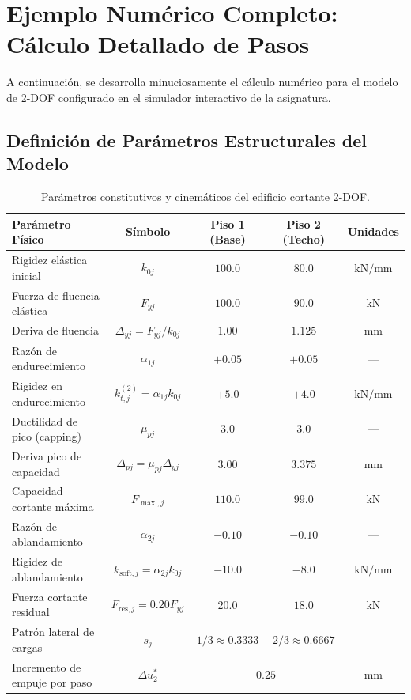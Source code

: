 \documentclass[11pt,letterpaper]{article}
\begin{document}
\section{Ejemplo Numérico Completo: Cálculo Detallado de Pasos}

A continuación, se desarrolla minuciosamente el cálculo numérico para el modelo de 2-DOF configurado en el simulador interactivo de la asignatura.

\subsection{Definición de Parámetros Estructurales del Modelo}

\begin{table}[htbp]
\centering
\caption{Parámetros constitutivos y cinemáticos del edificio cortante 2-DOF.}
\label{tab:parametros}
\begin{tabularx}{\textwidth}{lcccc}
\toprule
\textbf{Parámetro Físico} & \textbf{Símbolo} & \textbf{Piso 1 (Base)} & \textbf{Piso 2 (Techo)} & \textbf{Unidades} \\
\midrule
Rigidez elástica inicial & $k_{0j}$ & $100.0$ & $80.0$ & $\text{kN/mm}$ \\
Fuerza de fluencia elástica & $F_{yj}$ & $100.0$ & $90.0$ & $\text{kN}$ \\
Deriva de fluencia & $\Delta_{yj} = F_{yj}/k_{0j}$ & $1.00$ & $1.125$ & $\text{mm}$ \\
Razón de endurecimiento & $\alpha_{1j}$ & $+0.05$ & $+0.05$ & --- \\
Rigidez en endurecimiento & $k_{t,j}^{(2)} = \alpha_{1j} k_{0j}$ & $+5.0$ & $+4.0$ & $\text{kN/mm}$ \\
Ductilidad de pico (capping) & $\mu_{pj}$ & $3.0$ & $3.0$ & --- \\
Deriva pico de capacidad & $\Delta_{pj} = \mu_{pj}\Delta_{yj}$ & $3.00$ & $3.375$ & $\text{mm}$ \\
Capacidad cortante máxima & $F_{\max,j}$ & $110.0$ & $99.0$ & $\text{kN}$ \\
Razón de ablandamiento & $\alpha_{2j}$ & $-0.10$ & $-0.10$ & --- \\
Rigidez de ablandamiento & $k_{\text{soft},j} = \alpha_{2j} k_{0j}$ & $-10.0$ & $-8.0$ & $\text{kN/mm}$ \\
Fuerza cortante residual & $F_{\text{res},j} = 0.20 F_{yj}$ & $20.0$ & $18.0$ & $\text{kN}$ \\
\midrule
Patrón lateral de cargas & $s_j$ & $1/3 \approx 0.3333$ & $2/3 \approx 0.6667$ & --- \\
Incremento de empuje por paso & $\Delta u_2^*$ & \multicolumn{2}{c}{$0.25$} & $\text{mm}$ \\
\bottomrule
\end{tabularx}
\end{table}
\end{document}
